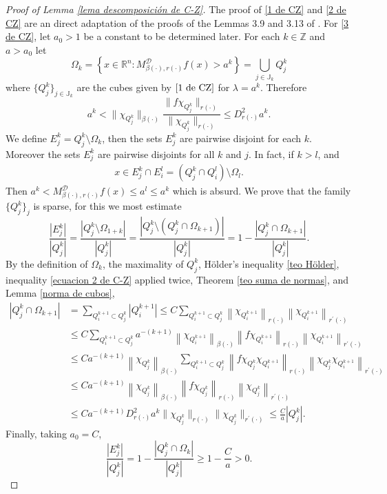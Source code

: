 \documentclass[a4paper,11pt,reqno]{amsart}
\theoremstyle{plain}
\numberwithin{equation}{section}
\theoremstyle{definition}
\newcommand{\R}{{\mathbb{R}^n}}
\begin{document}
\begin{proof}[Proof of Lemma \ref{lema descomposición de C-Z}]	
		The proof of \eqref{1 de CZ} and \eqref{2 de CZ} are an direct adaptation of the proofs of the Lemmas 3.9  and 3.13 of \cite{libro CU-FIO}. For \eqref{3 de CZ}, let $a_0 > 1$ be a constant to be determined later. For each $k\in\mathbb{Z}$ and $a>a_0$  let
		$$\Omega_k=\left\{x\in\R : M^{\mathcal{D}}_{{\beta(\cdot)},{r(\cdot)}}f(x)>a^k\right\}=\bigcup_{j\in {\mathbb{J}}_k} Q_j^k$$
		where $\{Q_j^k\}_{j\in{\mathbb{J}}_k}$ are the cubes given by $\eqref{1 de CZ}$ for $\lambda=a^k$. Therefore
			\begin{equation}\label{ecuacion 2 de C-Z}
				a^k<\|\chi_{Q_j^k}\|_{\beta(\cdot)}\frac{\|f\chi_{Q_j^k}\|_{r(\cdot)}}{\|\chi_{Q_j^k}\|_{r(\cdot)}}\leq D^2_{r(\cdot)} a^k.
			\end{equation}
		We define $E_j^k=Q_j^k\setminus\Omega_k$, then the sets $E_j^k$ are pairwise disjoint for each $k$. Moreover the sets $E_j^k$ are pairwise disjoints for all $k$ and $j$. In fact, if $k>l$, and   
		\begin{align*}
			x\in E_j^k\cap E_i^l=(Q_j^k\cap Q_i^l)\setminus \Omega_l.
		\end{align*}
		Then
		$a^k<M^{\mathcal{D}}_{{\beta(\cdot)},{r(\cdot)}}f(x)\leq a^l\leq a^k$ which is absurd. We prove that the family $\{Q_j^k\}_j$ is sparse, for this we most estimate
		$$\frac{|E_j^k|}{|Q_j^k|}=\frac{|Q_j^k\setminus\Omega_{1+k}|}{|Q_j^k|}=\frac{|Q_j^k\setminus(Q_j^k\cap\Omega_{k+1})|}{|Q_j^k|}=1-\frac{|Q_j^k\cap\Omega_{k+1}|}{|Q_j^k|}.$$	
		By the definition of $\Omega_k$, the maximality of $Q_j^k$, Hölder's inequality \ref{teo Hölder}, inequality \eqref{ecuacion 2 de C-Z} applied twice, Theorem \ref{teo suma de normas}, and Lemma \ref{norma de cubos},
		\begin{align*}
			|Q_j^k\cap\Omega_{k+1}|&=\sum_{Q_i^{k+1}\subset Q_j^k}\left|Q^{k+1}_i\right|\leq C \sum_{Q_i^{k+1}\subset Q_j^k}\left\|\chi_{Q^{k+1}_i}\right\|_{r(\cdot)}\left\|\chi_{Q^{k+1}_i}\right\|_{r^\prime(\cdot)}\\
			&\leq C \sum_{Q_i^{k+1}\subset Q_j^k}a^{-(k+1)}\left\|\chi_{Q^{k+1}_i}\right\|_{\beta(\cdot)}\left\|f\chi_{Q^{k+1}_i}\right\|_{r(\cdot)}\left\|\chi_{Q^{k+1}_i}\right\|_{r^\prime(\cdot)}\\
			&\leq C a^{-(k+1)} \left\|\chi_{Q^k_j}\right\|_{\beta(\cdot)}\sum_{Q_i^{k+1}\subset Q_j^k}\left\|f\chi_{Q_j^k}\chi_{Q^{k+1}_i}\right\|_{r(\cdot)}\left\|\chi_{Q^k_j}\chi_{Q^{k+1}_i}\right\|_{r^\prime(\cdot)}\\
			&\leq C a^{-(k+1)}\left\|\chi_{Q_j^k}\right\|_{\beta(\cdot)}\left\|f\chi_{Q_j^k}\right\|_{r(\cdot)}\left\|\chi_{Q_j^k}\right\|_{r^\prime(\cdot)}\\
			&\leq Ca^{-(k+1)}D^2_{r(\cdot)} a^k\|\chi_{Q_j^k}\|_{r(\cdot)}\|\chi_{Q_j^k}\|_{r^\prime(\cdot)}\leq \frac{C}{a}|Q_j^k|.
		\end{align*}
		Finally, taking $a_0=C$,
		\begin{equation*}
			\frac{|E_j^k|}{|Q_j^k|}=1-\frac{|Q_j^k\cap\Omega_k|}{|Q_j^k|}\geq 1- \frac{C}{a}>0.
		\end{equation*}
\end{proof}
\end{document}
